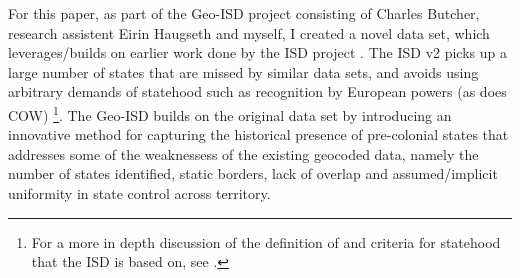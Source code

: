 \documentclass[12pt]{article}
\begin{document}
For this paper, as part of the Geo-ISD project consisting of Charles Butcher,
research assistent Eirin Haugseth and myself, I created a novel data set, which
leverages/builds on earlier work done by the ISD project \citep{Butcher2020}.
The ISD v2 picks up a large number of states that are missed by similar data
sets, and avoids using arbitrary demands of statehood such as recognition by
European powers (as does COW) \citep{Butcher2020}\footnote{For a more in depth
	discussion of the definition of and criteria for statehood that the ISD
is based on, see \citet{Butcher2017}.}. The Geo-ISD builds on the original data
set by introducing an innovative method for capturing the historical presence of
pre-colonial states that addresses some of the weaknessess of the existing
geocoded data, namely the number of states identified, static borders, lack of
overlap and assumed/implicit uniformity in state control across territory.
\end{document}
